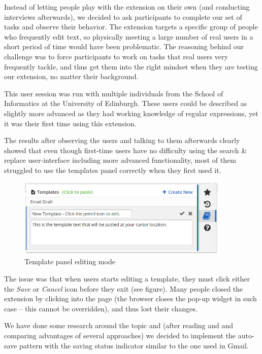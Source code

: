 \documentclass[bsc,frontabs,twoside,singlespacing,parskip,deptreport]{infthesis}
\begin{document}
Instead of letting people play with the extension on their own (and conducting interviews afterwards), we decided to ask participants to complete our set of tasks and observe their behavior. The extension targets a specific group of people who frequently edit text, so physically meeting a large number of real users in a short period of time would have been problematic. The reasoning behind our challenge was to force participants to work on tasks that real users very frequently tackle, and thus get them into the right mindset when they are testing our extension, no matter their background.

This user session was run with multiple individuals from the School of Informatics at the University of Edinburgh. These users could be described as slightly more advanced as they had working knowledge of regular expressions, yet it was their first time using this extension.

The results after observing the users and talking to them afterwards clearly showed that even though first-time users have no difficulty using the search \& replace user-interface including more advanced functionality, most of them struggled to use the templates panel correctly when they first used it. 

\begin{figure}[h]
\centering
\includegraphics[width=0.9\textwidth]{../graphics/template-edit-mode.png}
\caption{Template panel editing mode}
\end{figure}

The issue was that when users starts editing a template, they must click either the \textit{Save} or \textit{Cancel} icon before they exit (see figure). Many people closed the extension by clicking into the page (the browser closes the pop-up widget in such case -- this cannot be overridden), and thus lost their changes.

We have done some research around the topic and (after reading \cite{A26} and \cite{A27} and comparing advantages of several approaches) we decided to implement the auto-save pattern with the saving status indicator similar to the one used in Gmail.
\end{document}
